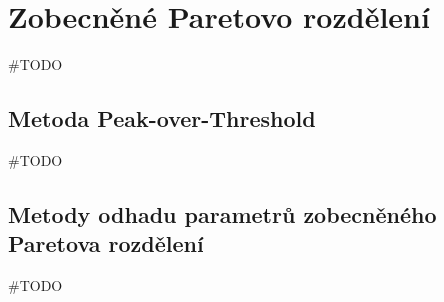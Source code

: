 \chapter{Zobecněné Paretovo rozdělení}
\#TODO
\section{Metoda Peak-over-Threshold}
\#TODO
\section{Metody odhadu parametrů zobecněného Paretova rozdělení}
\#TODO